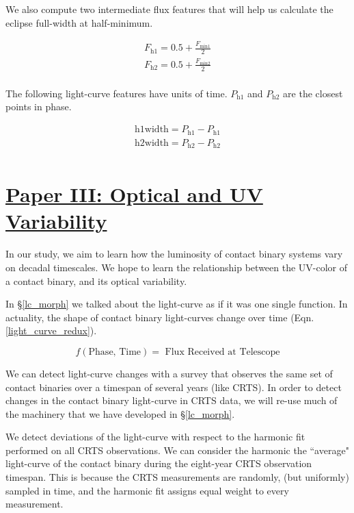 \documentclass[12pt]{article} %
\numberwithin{equation}{section} %
\begin{document}
We also compute two intermediate flux features that will help us calculate the eclipse full-width at half-minimum. 

\begin{multline}
F_{\text{h1}} = 0.5 + \frac{F_{\text{min1}}}{2} \\
F_{\text{h2}} = 0.5 + \frac{F_{\text{min2}}}{2} \\
\end{multline}

The following light-curve features have units of time. $P_{\text{h1}}$ and $P_{\text{h2}}$ are the closest points in phase.

\begin{multline} \label{time_features}
\text{h1width} = P_{\text{h1}} - P_{\text{h1}} \\
\text{h2width} = P_{\text{h2}} - P_{\text{h2}}  \\
\end{multline}

\section[Paper III: Optical and UV Variability]{\hyperlink{toc}{Paper III: Optical and UV Variability}} \label{sec: Paper III: Optical and UV Variability}

In our study, we aim to learn how the luminosity of contact binary systems vary on decadal timescales. We hope to learn the relationship between the UV-color of a contact binary, and its optical variability. 

In \S\ref{lc_morph} we talked about the light-curve as if it was one single function. In actuality, the shape of contact binary light-curves change over time (Eqn. \ref{light_curve_redux}). 

\begin{equation} \label{eqn: light_curve_redux}
f(\text{Phase, Time}) = \text{ Flux Received at Telescope}
\end{equation}

We can detect light-curve changes with a survey that observes the same set of contact binaries over a timespan of several years (like CRTS). In order to detect changes in the contact binary light-curve in CRTS data, we will re-use much of the machinery that we have developed in \S\ref{lc_morph}.

We detect deviations of the light-curve with respect to the harmonic fit performed on all CRTS observations. We can consider the harmonic the ``average" light-curve of the contact binary during the eight-year CRTS observation timespan. This is because the CRTS measurements are randomly, (but uniformly) sampled in time, and the harmonic fit assigns equal weight to every measurement. 
\end{document}
